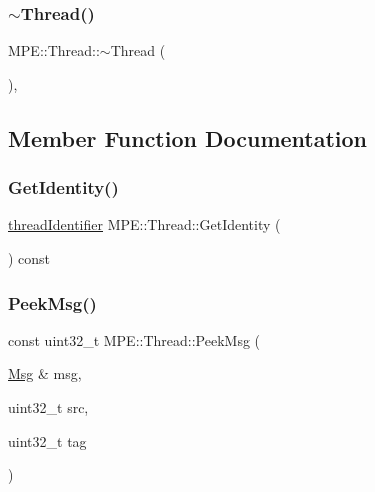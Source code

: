 \subsubsection{\texorpdfstring{$\sim$\+Thread()}{~Thread()}}
{\footnotesize\ttfamily M\+P\+E\+::\+Thread\+::$\sim$\+Thread (\begin{DoxyParamCaption}{ }\end{DoxyParamCaption})\hspace{0.3cm}{\ttfamily [protected]}, {\ttfamily [virtual]}}



\subsection{Member Function Documentation}
\mbox{\label{class_m_p_e_1_1_thread_a736d2fc9d527a96419b428e018d225b3}} 
\subsubsection{\texorpdfstring{Get\+Identity()}{GetIdentity()}}
{\footnotesize\ttfamily \hyperlink{namespace_m_p_e_a16447295e3105bd2ba2a9ea303566175}{thread\+Identifier} M\+P\+E\+::\+Thread\+::\+Get\+Identity (\begin{DoxyParamCaption}{ }\end{DoxyParamCaption}) const\hspace{0.3cm}{\ttfamily [inline]}}

\mbox{\label{class_m_p_e_1_1_thread_afa51801ad970ca768ec5160d7c0d7d42}} 
\subsubsection{\texorpdfstring{Peek\+Msg()}{PeekMsg()}}
{\footnotesize\ttfamily const uint32\+\_\+t M\+P\+E\+::\+Thread\+::\+Peek\+Msg (\begin{DoxyParamCaption}\item[{\hyperlink{struct_m_p_e_1_1_msg}{Msg} \&}]{msg,  }\item[{uint32\+\_\+t}]{src,  }\item[{uint32\+\_\+t}]{tag }\end{DoxyParamCaption})\hspace{0.3cm}{\ttfamily [protected]}}



